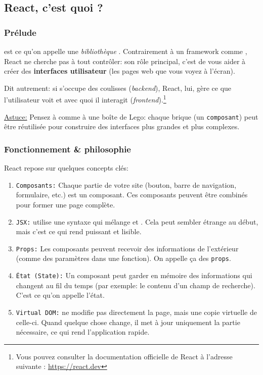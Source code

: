 \subsection{React, c'est quoi ?}

\subsubsection[Prélude]{Prélude}

\react{} est ce qu’on appelle une \textit{bibliothèque \js{}}. Contrairement à un framework comme \laravel{}{}, React ne cherche pas à tout contrôler: son rôle principal, c’est de vous aider à créer des \textbf{interfaces utilisateur} (les pages web que vous voyez à l’écran). 

Dit autrement: si \laravel{} s’occupe des coulisses (\textit{backend}), React, lui, gère ce que l’utilisateur voit et avec quoi il interagit (\textit{frontend}).\footnote{Vous pouvez consulter la documentation officielle de React à l'adresse suivante : \href{https://react.dev}{https://react.dev}} 

\underline{Astuce:} Pensez à \react{} comme à une boîte de Lego: chaque brique (un \texttt{composant}) peut être réutilisée pour construire des interfaces plus grandes et plus complexes.

\subsubsection[Fonctionnement et philosophie]{Fonctionnement \& philosophie}

React repose sur quelques concepts clés:

\begin{enumerate}
    \item \texttt{Composants:} Chaque partie de votre site (bouton, barre de navigation, formulaire, etc.) est un composant. Ces composants peuvent être combinés pour former une page complète.
    \item \texttt{JSX:} \react{} utilise une syntaxe qui mélange \js{} et \html{}. Cela peut sembler étrange au début, mais c’est ce qui rend \react{} puissant et lisible.
    \item \texttt{Props:} Les composants peuvent recevoir des informations de l’extérieur (comme des paramètres dans une fonction). On appelle ça des \texttt{props}.
    \item \texttt{État (State):} Un composant peut garder en mémoire des informations qui changent au fil du temps (par exemple: le contenu d’un champ de recherche). C’est ce qu’on appelle l’état.
    \item \texttt{Virtual DOM:} \react{} ne modifie pas directement la page, mais une copie virtuelle de celle-ci. Quand quelque chose change, il met à jour uniquement la partie nécessaire, ce qui rend l’application rapide.
\end{enumerate}

